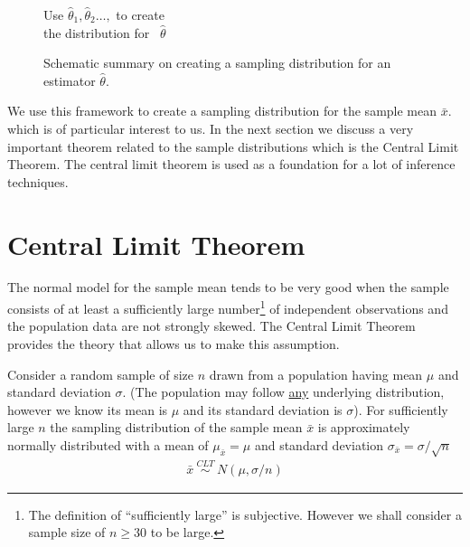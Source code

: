 \begin{figure}[H]
\begin{center}
\hspace*{-1.50cm}	Use $\hat{\theta}_{1}, \hat{\theta}_{2} \ldots, $ to create\\
\vspace{0.1cm}
\hspace*{-1.50cm}	the distribution for~ $\hat{\theta}$
\end{center}

\caption{Schematic summary on creating a sampling distribution for an estimator $\hat{\theta}$.}
\label{schematicSumamryOfSamplingDistribution}
\end{figure}


We use this framework to create a sampling distribution for the sample mean $\bar{x}$.
which is of particular interest to us.
In the next section we discuss a very important theorem related to the sample distributions which is the Central Limit Theorem.
The central limit theorem is used as a foundation for a lot of inference techniques.



\section{Central Limit Theorem}
\label{cltSection}



The normal model for the sample mean tends to be very good when the sample consists of at least a sufficiently large number\footnote{The definition of ``sufficiently large'' is subjective. However we shall consider a sample size of $n \geq30$ to be large.} of independent observations and the population data are not strongly skewed. The Central Limit Theorem provides the theory that allows us to make this assumption.


\begin{termBox}{
Consider a random sample of size $n$ drawn from a population having mean $\mu$ and standard deviation $\sigma$. 
(The population may follow \underline{any} underlying distribution, however we know its mean
is $\mu$ and its standard deviation is $\sigma$).
For sufficiently large $n$ the sampling distribution of the sample mean $\bar{x}$ is approximately normally distributed with a 
mean of $\mu_{\bar{x}} = \mu$ and standard deviation $\sigma_{\bar{x}} = \sigma / \sqrt{n}$
\begin{align*}
\bar{x}	~\stackrel{CLT}{\sim}~	N(\mu, \sigma/n)
\end{align*}
}
\end{termBox}


